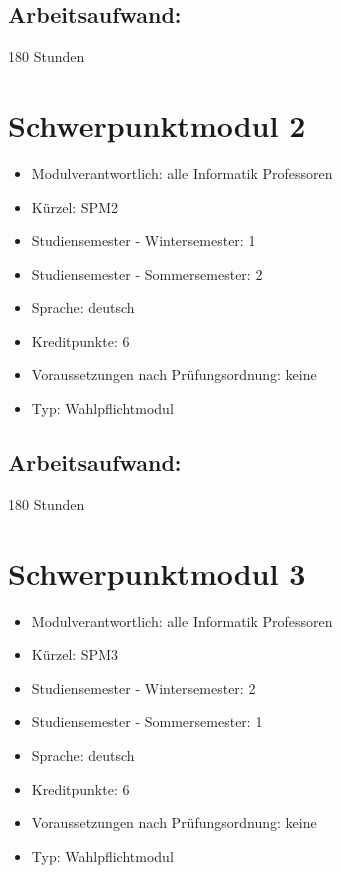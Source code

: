 \section*{Arbeitsaufwand:}\label{arbeitsaufwand-3}

180 Stunden

\chapter{Schwerpunktmodul 2}\label{schwerpunktmodul-2}

\begin{itemize}
\tightlist
\item
  Modulverantwortlich: alle Informatik Professoren
\item
  Kürzel: SPM2
\item
  Studiensemester - Wintersemester: 1
\item
  Studiensemester - Sommersemester: 2
\item
  Sprache: deutsch
\item
  Kreditpunkte: 6
\item
  Voraussetzungen nach Prüfungsordnung: keine
\item
  Typ: Wahlpflichtmodul
\end{itemize}

\section*{Arbeitsaufwand:}\label{arbeitsaufwand-4}

180 Stunden

\chapter{Schwerpunktmodul 3}\label{schwerpunktmodul-3}

\begin{itemize}
\tightlist
\item
  Modulverantwortlich: alle Informatik Professoren
\item
  Kürzel: SPM3
\item
  Studiensemester - Wintersemester: 2
\item
  Studiensemester - Sommersemester: 1
\item
  Sprache: deutsch
\item
  Kreditpunkte: 6
\item
  Voraussetzungen nach Prüfungsordnung: keine
\item
  Typ: Wahlpflichtmodul
\end{itemize}

